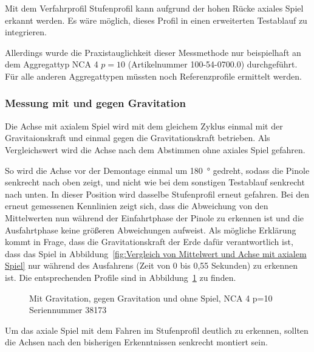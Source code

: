 Mit dem Verfahrprofil Stufenprofil kann aufgrund der hohen Rücke axiales Spiel erkannt werden. Es wäre möglich, dieses Profil in einen erweiterten Testablauf zu integrieren.

Allerdings wurde die Praxistauglichkeit dieser Messmethode nur beispielhaft an dem Aggregattyp NCA 4 $p = 10$ (Artikelnummer 100-54-0700.0) durchgeführt. Für alle anderen Aggregattypen müssten noch Referenzprofile ermittelt werden. 




\subsubsection{Messung mit und gegen Gravitation}\label{cha:Anhang_3}


Die Achse mit axialem Spiel wird mit dem gleichem Zyklus einmal mit der Gravitaionskraft und einmal gegen die Gravitationskraft betrieben. Als Vergleichswert wird die Achse nach dem Abstimmen ohne axiales Spiel gefahren. 

So wird die Achse vor der Demontage einmal um \SI{180}{\degree} gedreht, sodass die Pinole senkrecht nach oben zeigt, und nicht wie bei dem sonstigen Testablauf senkrecht nach unten. In dieser Position wird dasselbe Stufenprofil erneut gefahren. Bei den erneut gemessenen Kennlinien zeigt sich, dass die Abweichung von den Mittelwerten nun während der Einfahrtphase der Pinole zu erkennen ist und die Ausfahrtphase keine größeren Abweichungen aufweist. Als mögliche Erklärung kommt in Frage, dass die Gravitationskraft der Erde dafür verantwortlich ist, dass das Spiel in Abbildung~\ref{fig:Vergleich von Mittelwert und Achse mit axialem Spiel} nur während des Ausfahrens (Zeit von 0 bis 0,55 Sekunden) zu erkennen ist. Die entsprechenden Profile sind in Abbildung~\ref{fig_Mit_Gravitation} zu finden.


\begin{figure}[H]
\centering

\caption{Mit Gravitation, gegen Gravitation und ohne Spiel, NCA 4 p=10 Seriennummer 38173}
\label{fig_Mit_Gravitation}
\end{figure}


Um das axiale Spiel mit dem Fahren im Stufenprofil deutlich zu erkennen, sollten die Achsen nach den bisherigen Erkenntnissen senkrecht montiert sein.








